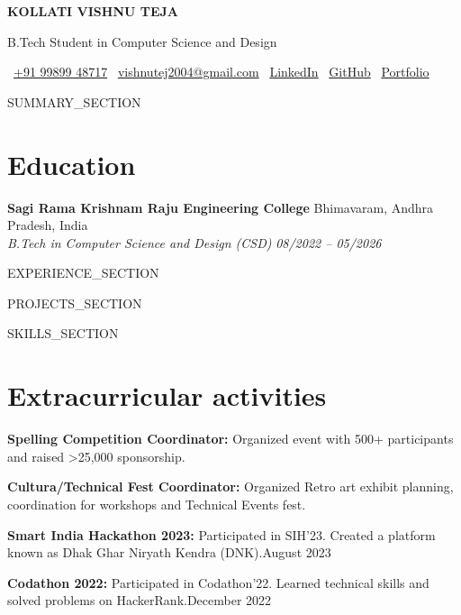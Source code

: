 \documentclass[letterpaper]{article}
\renewcommand{\normalsize}{\fontsize{10pt}{12pt}\selectfont}
\begin{document}
\begin{center}
    \fontsize{17pt}{20pt}\selectfont\textbf{KOLLATI VISHNU TEJA}

    \vspace{3pt}
    \normalsize
    B.Tech Student in Computer Science and Design

    \vspace{5pt}
    \small
    \faPhone\ \href{tel:+919989948717}{+91 99899 48717} \quad\textbar\quad
    \faEnvelope\ \href{mailto:vishnutej2004@gmail.com}{vishnutej2004@gmail.com} \quad\textbar\quad
    \faLinkedin\ \href{https://www.linkedin.com/in/vishnutej0098/}{LinkedIn} \quad\textbar\quad
    \faGithub\ \href{https://github.com/vishnutej000}{GitHub} \quad\textbar\quad
    \faGlobe\ \href{https://vishnutej.tech}{Portfolio} \\[3pt]
\end{center}

{{SUMMARY_SECTION}}

\section{Education}
\textbf{Sagi Rama Krishnam Raju Engineering College} \hfill Bhimavaram, Andhra Pradesh, India \\
\textit{B.Tech in Computer Science and Design (CSD)} \hfill \textit{08/2022 -- 05/2026}

{{EXPERIENCE_SECTION}}

{{PROJECTS_SECTION}}

{{SKILLS_SECTION}}

\section{Extracurricular activities}
\begin{highlights}
    \item \textbf{Spelling Competition Coordinator:} Organized event with 500+ participants and raised \textgreater 25,000 sponsorship.
    \item \textbf{Cultura/Technical Fest Coordinator:} Organized Retro art exhibit planning, coordination for workshops and Technical Events fest.
    \item \textbf{Smart India Hackathon 2023:} Participated in SIH'23. Created a platform known as Dhak Ghar Niryath Kendra (DNK).\hfill August 2023
    \item \textbf{Codathon 2022:} Participated in Codathon'22. Learned technical skills and solved problems on HackerRank.\hfill December 2022
\end{highlights}
\end{document}
